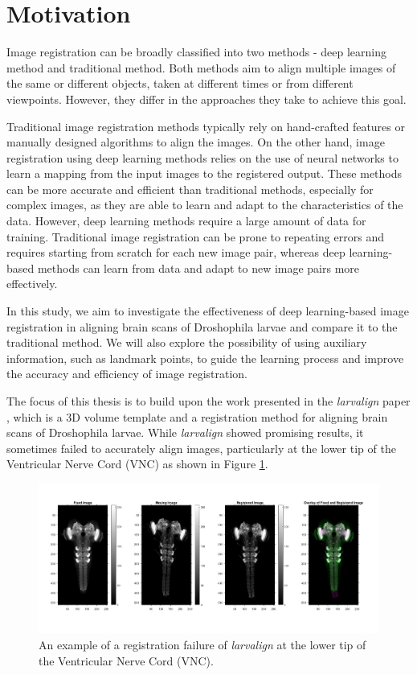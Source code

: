 \documentclass{report}
\begin{document}
	\section{Motivation}
	Image registration can be broadly classified into two methods - deep learning method and traditional method. Both methods aim to align multiple images of the same or different objects, taken at different times or from different viewpoints. However, they differ in the approaches they take to achieve this goal.
	
	Traditional image registration methods typically rely on hand-crafted features or manually designed algorithms to align the images. On the other hand, image registration using deep learning methods relies on the use of neural networks to learn a mapping from the input images to the registered output. These methods can be more accurate and efficient than traditional methods, especially for complex images, as they are able to learn and adapt to the characteristics of the data. However, deep learning methods require a large amount of data for training. Traditional image registration can be prone to repeating errors and requires starting from scratch for each new image pair, whereas deep learning-based methods can learn from data and adapt to new image pairs more effectively.
	
	In this study, we aim to investigate the effectiveness of deep learning-based image registration in aligning brain scans of Droshophila larvae and compare it to the traditional method. We will also explore the possibility of using auxiliary information, such as landmark points, to guide the learning process and improve the accuracy and efficiency of image registration.
	
	The focus of this thesis is to build upon the work presented in the \textit{larvalign} paper \cite{larvalign}, which is a 3D volume template and a registration method for aligning brain scans of Droshophila larvae. While \textit{larvalign} showed promising results, it sometimes failed to accurately align images, particularly at the lower tip of the Ventricular Nerve Cord (VNC) as shown in Figure \ref{fig:Registraion_Failure}.
	
	\begin{figure}[h]
		\centering
		\includegraphics[width=\linewidth]{resources/motivation_fig_1.jpg}
		\caption{An example of a registration failure of \textit{larvalign} \cite{larvalign} at the lower tip of the Ventricular Nerve Cord (VNC).}
		\label{fig:Registraion_Failure}
	\end{figure}
	
\end{document}
